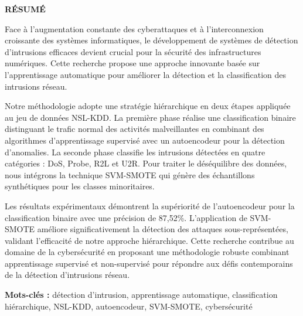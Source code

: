 \newpage
\thispagestyle{empty}

\begin{center}
    \vspace{2cm}
    {\Large \textbf{\color{blueuniv}RÉSUMÉ}}
    \vspace{1cm}
\end{center}

\noindent
Face à l'augmentation constante des cyberattaques et à l'interconnexion croissante des systèmes informatiques, le développement de systèmes de détection d'intrusions efficaces devient crucial pour la sécurité des infrastructures numériques. Cette recherche propose une approche innovante basée sur l'apprentissage automatique pour améliorer la détection et la classification des intrusions réseau.

\vspace{0.5cm}

\noindent
Notre méthodologie adopte une stratégie hiérarchique en deux étapes appliquée au jeu de données NSL-KDD. La première phase réalise une classification binaire distinguant le trafic normal des activités malveillantes en combinant des algorithmes d'apprentissage supervisé avec un autoencodeur pour la détection d'anomalies. La seconde phase classifie les intrusions détectées en quatre catégories : DoS, Probe, R2L et U2R. Pour traiter le déséquilibre des données, nous intégrons la technique SVM-SMOTE qui génère des échantillons synthétiques pour les classes minoritaires.

\vspace{0.5cm}

\noindent
Les résultats expérimentaux démontrent la supériorité de l'autoencodeur pour la classification binaire avec une précision de 87,52\%. L'application de SVM-SMOTE améliore significativement la détection des attaques sous-représentées, validant l'efficacité de notre approche hiérarchique. Cette recherche contribue au domaine de la cybersécurité en proposant une méthodologie robuste combinant apprentissage supervisé et non-supervisé pour répondre aux défis contemporains de la détection d'intrusions réseau.

\vspace{1cm}

\noindent
\textbf{Mots-clés :} détection d'intrusion, apprentissage automatique, classification hiérarchique, NSL-KDD, autoencodeur, SVM-SMOTE, cybersécurité

\newpage



